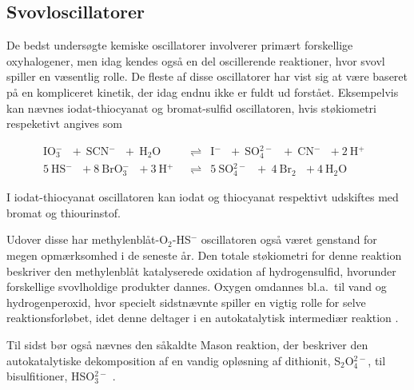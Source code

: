 \subsection{Svovloscillatorer}
{
\newcommand{\iodat}  {\mbox{IO$_3^-$ }}
\newcommand{\bromat} {\mbox{BrO$_3^-$ }}
\newcommand{\oxy}    {\mbox{O$_2$ }}
\newcommand{\htoo}   {\mbox{H$_2$O }}
\newcommand{\prot}   {\mbox{H$^+$ }}
\newcommand{\thio}   {\mbox{SCN$^-$ }}
\newcommand{\iodid}  {\mbox{I$^-$ }}
\newcommand{\sofire} {\mbox{SO$_4^{2-}$ }}
\newcommand{\cyanid} {\mbox{CN$^-$ }}
\newcommand{\brom}   {\mbox{Br$_2$ }}
\newcommand{\hs}     {\mbox{HS$^-$ }}
De bedst unders{\o}gte kemiske oscillatorer involverer
prim{\ae}rt forskellige oxyhalogener, men idag kendes
ogs{\aa} en del oscillerende reaktioner, hvor svovl spiller
en v{\ae}sentlig rolle. De fleste af disse oscillatorer har
vist sig at v{\ae}re baseret p{\aa} en kompliceret kinetik,
der idag endnu ikke er fuldt ud forst{\aa}et. Eksempelvis
kan n{\ae}vnes iodat-thiocyanat \cite{ThioCyanat} og
bromat-sulfid \cite{BromatSulfid} oscillatoren, hvis
st{\o}kiometri respeketivt angives som

\begin{eqnarray}
  \iodat +~\thio +~\htoo & \rightleftharpoons & 
  \iodid +~\sofire +~\cyanid + 2~\prot \\
  5~\hs + 8~\bromat + 3~\prot & \rightleftharpoons &
  5~\sofire +~4~\brom + 4~\htoo
\end{eqnarray}

I iodat-thiocyanat oscillatoren kan iodat og thiocyanat
respektivt udskiftes med bromat og thiourinstof. 

\vspace{4.0mm}
Udover disse har methylenbl{\aa}t-O$_2$-HS$^-$ oscillatoren
ogs{\aa} v{\ae}ret genstand for megen opm{\ae}rksomhed i de
seneste {\aa}r. Den totale st{\o}kiometri for denne
reaktion beskriver den methylenbl{\aa}t katalyserede
oxidation af hydrogensulfid, hvorunder forskellige
svovlholdige produkter dannes. Oxygen omdannes bl.a.\
til vand og hydrogenperoxid, hvor specielt sidstn{\ae}vnte
spiller en vigtig rolle for selve reaktionsforl{\o}bet,
idet denne deltager i en autokatalytisk intermedi{\ae}r
reaktion \cite{KemiskProjekt}.

\vspace{4.0mm}
Til sidst b{\o}r ogs{\aa} n{\ae}vnes den s{\aa}kaldte Mason
reaktion, der beskriver den autokatalytiske dekomposition
af en vandig opl{\o}sning af dithionit, S$_2$O$_4^{2-}$,
til bisulfitioner, HSO$_3^{2-}$
\cite{Dithionit1,Dithionit2}.
}

